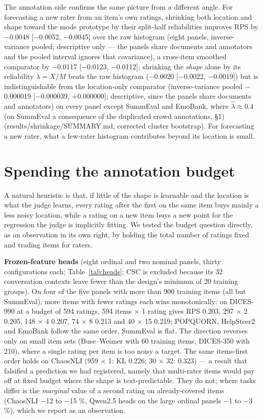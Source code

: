 \documentclass[10pt]{article}
\begin{document}
The annotation side confirms the same picture from a different angle. For forecasting a new rater from an item's own ratings, shrinking both location and shape toward the mode prototype by their split-half reliabilities improves RPS by $-$0.0048 {[}$-$0.0052, $-$0.0045{]} over the raw histogram (eight panels, inverse-variance pooled; descriptive only --- the panels share documents and annotators and the pooled interval ignores that covariance), a cross-item smoothed comparator by $-$0.0117 {[}$-$0.0123, $-$0.0112{]}; shrinking the \emph{shape} alone by its reliability \(\lambda=X/M\) beats the raw histogram ($-$0.0020 {[}$-$0.0022, $-$0.0019{]}) but is indistinguishable from the location-only comparator (inverse-variance pooled $-$0.000019 {[}$-$0.000039, +0.000000{]}; descriptive, since the panels share documents and annotators) on every panel except SummEval and EmoBank, where \(\hat\lambda\approx0.4\) (on SummEval a consequence of the duplicated crowd annotations, \S{}1) (results/shrinkage/SUMMARY.md, corrected cluster bootstrap). For forecasting a new rater, what a few-rater histogram contributes beyond its location is small.

\section{Spending the annotation budget}



A natural heuristic is that, if little of the shape is learnable and the location is what the judge learns, every rating after the first on the same item buys mainly a less noisy location, while a rating on a new item buys a new point for the regression the judge is implicitly fitting. We tested the budget question directly, as an observation in its own right, by holding the total number of ratings fixed and trading items for raters.

\textbf{Frozen-feature heads} (eight ordinal and two nominal panels, thirty configurations each; Table~\ref{tab:heads}; CSC is excluded because its 32 conversation contexts leave fewer than the design's minimum of 20 training groups). On four of the five panels with more than 900 training items (all but SummEval), more items with fewer ratings each wins monotonically: on DICES-990 at a budget of 594 ratings, 594 items $\times$ 1 rating gives RPS 0.203, 297 $\times$ 2 0.205, 148 $\times$ 4 0.207, 74 $\times$ 8 0.213 and 40 $\times$ 15 0.219; POPQUORN, HelpSteer2 and EmoBank follow the same order, SummEval is flat. The direction reverses only on small item sets (Buse--Weimer with 60 training items, DICES-350 with 210), where a single rating per item is too noisy a target. The same items-first order holds on ChaosNLI (959 $\times$ 1: KL 0.226; 30 $\times$ 32: 0.323) --- a result that falsified a prediction we had registered, namely that multi-rater items would pay off at fixed budget where the shape is text-predictable. They do not; where tasks differ is the \emph{marginal} value of a second rating on already-covered items (ChaosNLI $-$12 to $-$15 \%, Qwen2.5 heads on the large ordinal panels $-$1 to $-$3 \%), which we report as an observation.
\end{document}
